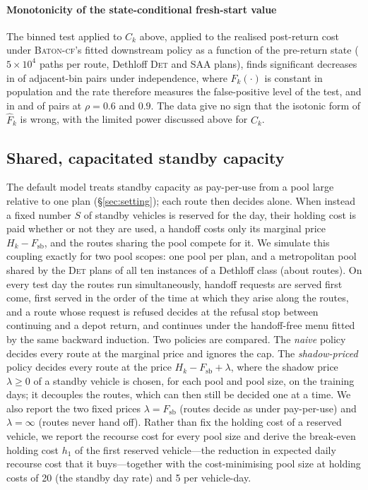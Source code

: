 \documentclass[preprint,authoryear,12pt]{elsarticle}
\theoremstyle{definition}
\theoremstyle{remark}
\begin{document}
\paragraph{Monotonicity of the state-conditional fresh-start value}
The binned test applied to $C_k$ above, applied to the realised
post-return cost under \textsc{Baton-cf}'s fitted downstream policy as a
function of the pre-return state ($5\times10^4$ paths per route, Dethloff
\textsc{Det} and \textsc{SAA} plans), finds significant decreases in
\shapeFZero{} of adjacent-bin pairs under independence, where
$F_k(\cdot)$ is constant in population and the rate therefore measures
the false-positive level of the test, and in \shapeFSix{} and
\shapeFNine{} of pairs at $\rho = 0.6$ and $0.9$. The data give no
sign that the isotonic form of $\widehat F_k$ is wrong, with the limited
power discussed above for $C_k$.


\subsection{Shared, capacitated standby capacity}\label{sec:pool}

The default model treats standby capacity as pay-per-use from a pool
large relative to one plan (\S\ref{sec:setting}); each route then
decides alone. When instead a fixed number $S$ of standby vehicles is
reserved for the day, their holding cost is paid whether or not they are
used, a handoff costs only its marginal price $H_k - F_{\mathrm{sb}}$,
and the routes sharing the pool compete for it. We simulate this
coupling exactly for two pool scopes: one pool per plan, and a
metropolitan pool shared by the \textsc{Det} plans of all ten instances
of a Dethloff class (about \poolMetroK{} routes). On every test day the
routes run simultaneously, handoff requests are served first come,
first served in the order of the time at which they arise along the
routes, and a route whose request is refused decides at the refusal stop
between continuing and a depot return, and continues under the
handoff-free menu fitted by the same backward induction. Two policies
are compared. The \emph{naive} policy decides every route at the
marginal price and ignores the cap. The \emph{shadow-priced} policy
decides every route at the price $H_k - F_{\mathrm{sb}} + \lambda$,
where the shadow price $\lambda \ge 0$ of a standby vehicle is chosen,
for each pool and pool size, on the training days; it decouples the
routes, which can then still be decided one at a time. We also report
the two fixed prices $\lambda = F_{\mathrm{sb}}$ (routes decide as under
pay-per-use) and $\lambda = \infty$ (routes never hand off). Rather than
fix the holding cost of a reserved vehicle, we report the recourse cost
for every pool size and derive the break-even holding cost $h_1$ of the
first reserved vehicle---the reduction in expected daily recourse cost
that it buys---together with the cost-minimising pool size at holding
costs of 20 (the standby day rate) and 5 per vehicle-day.
\end{document}

